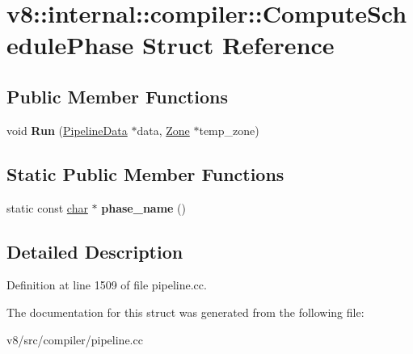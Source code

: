 \hypertarget{structv8_1_1internal_1_1compiler_1_1ComputeSchedulePhase}{}\section{v8\+:\+:internal\+:\+:compiler\+:\+:Compute\+Schedule\+Phase Struct Reference}
\label{structv8_1_1internal_1_1compiler_1_1ComputeSchedulePhase}
\subsection*{Public Member Functions}
\begin{DoxyCompactItemize}
\item 
\mbox{\label{structv8_1_1internal_1_1compiler_1_1ComputeSchedulePhase_ace957b71908a3e75b7203ab1ffd2295b}} 
void {\bfseries Run} (\mbox{\hyperlink{classv8_1_1internal_1_1compiler_1_1PipelineData}{Pipeline\+Data}} $\ast$data, \mbox{\hyperlink{classv8_1_1internal_1_1Zone}{Zone}} $\ast$temp\+\_\+zone)
\end{DoxyCompactItemize}
\subsection*{Static Public Member Functions}
\begin{DoxyCompactItemize}
\item 
\mbox{\label{structv8_1_1internal_1_1compiler_1_1ComputeSchedulePhase_af7c63c7c5ba6b2b6bf1900e55ad7de53}} 
static const \mbox{\hyperlink{classchar}{char}} $\ast$ {\bfseries phase\+\_\+name} ()
\end{DoxyCompactItemize}


\subsection{Detailed Description}


Definition at line 1509 of file pipeline.\+cc.



The documentation for this struct was generated from the following file\+:\begin{DoxyCompactItemize}
\item 
v8/src/compiler/pipeline.\+cc\end{DoxyCompactItemize}
